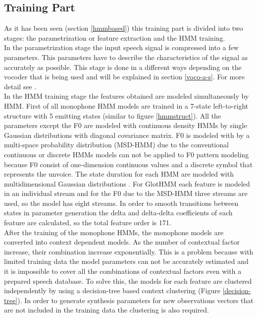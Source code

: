 \subsection{Training Part}\label{tpart} 
As it has been seen (section \ref{hmmbased}) this training part is divided into two stages: the parametrization or feature extraction and the HMM training.\\
In the parametrization stage the input speech signal is compressed into a few parameters. This parameters have to describe the characteristics of the signal as accurately as possible. This stage is done in a different ways depending on the vocoder that is being used and will be explained in section \ref{voco-a-s}. For more detail see \cite{tuomo} \cite{manu}.\\
In the HMM training stage the features obtained are modeled simultaneously by HMM. First of all monophone HMM models are trained in a 7-state left-to-right structure with 5 emitting states (similar to figure \ref{hmmstruct}). All the parameters except the F0 are modeled with continuous density HMMs by single Gaussian distributions with diagonal covariance matrix. F0 is modeled with by a multi-space probability distribution (MSD-HMM) \cite{introhmmbased} due to the conventional continuous or discrete HMMs models can not be applied to F0 pattern modeling because F0 consist of one-dimension continuous values and a discrete symbol that represents the unvoice. The state duration for each HMM are modeled with multidimensional Gaussian distributions \cite{yoshimura1998duration}. For GlotHMM each feature is modeled in an individual stream and for the F0 due to the MSD-HMM three streams are used, so the model has eight streams. In order to smooth transitions between states in parameter generation the delta and delta-delta coefficients of each feature are calculated, so the total feature order is 171.\\
After the training of the monophone HMMs, the monophone models are converted into context dependent models. As the number of contextual factor increase, their combination increase exponentially. This is a problem because with limited training data the model parameters can not be accurately estimated and it is impossible to cover all the combinations of contextual factors even with a prepared  speech database. To solve this, the models for each feature are clustered independently by using a decision-tree based context clustering (Figure \ref{decision-tree}). In order to generate synthesis parameters for new observations vectors that are not included in the training data the clustering is also required.
